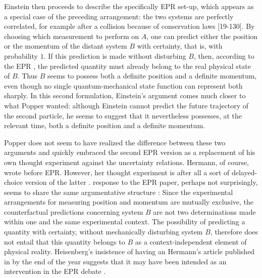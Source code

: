 \documentclass[final,12pt]{article}
\newcommand{\TE}{thought experiment\xspace}
\newcommand{\UR}{uncertainty relations\xspace}
\newcommand{\NW}{\jt{Die Naturwissenschaften}\xspace}
\begin{document}
Einstein then proceeds to describe the specifically EPR set-up, which appears as a special case of the preceding arrangement: the two systems are perfectly correlated, for example after a collision because of conservation laws [19-130]. By choosing which measurement to perform on $A$, one can predict either the position or the momentum of the distant system $B$ with certainty, that is, with probability $1$. If this prediction is made without disturbing $B$, then, according to the EPR , the predicted quantity must already belong to the real physical state of $B$. Thus $B$ seems to possess both a definite position and a definite momentum, even though no single quantum-mechanical state function can represent both sharply. In this second formulation, Einstein's argument comes much closer to what Popper wanted: although Einstein cannot predict the future trajectory of the second particle, he seems to suggest that it nevertheless possesses, at the relevant time, both a definite position and a definite momentum. 

Popper does not seem to have realized the difference between these two arguments and quickly embraced the second EPR version as a  replacement of his own \TE against the \UR. Hermann, of course, wrote before EPR. However, her \TE is after all a sort of delayed-choice version of the latter \citep{Jammer1974}.  response to the EPR paper, perhaps not surprisingly, seems to share the same argumentative structure \citep{Bacciagaluppi2017}: Since the experimental arrangements for measuring position and momentum are mutually exclusive, the counterfactual predictions concerning system $B$ are not two determinations made within one and the same experimental context. The possibility of predicting a quantity with certainty, without mechanically disturbing system $B$, therefore does not entail that this quantity belongs to $B$ as a context-independent element of physical reality. Heisenberg's insistence of having an  Hermann’s article published in \NW by the end of the year suggests that it may have been intended as an intervention in the EPR debate \citep[43]{BacciagaluppiCrull2024}.
\end{document}
